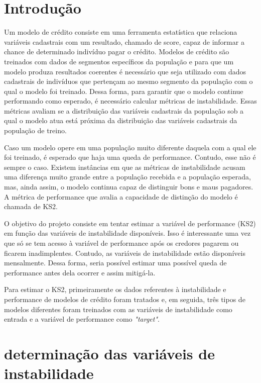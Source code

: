 \section{Introdução}
    Um modelo de crédito consiste em uma ferramenta estatística que relaciona variáveis cadastrais com um resultado, chamado de score, capaz de informar a chance de determinado indivíduo pagar o crédito.
    Modelos de crédito são treinados com dados de segmentos específicos da população e para que um modelo produza resultados coerentes é necessário que seja utilizado com dados cadastrais de indivíduos que pertençam ao mesmo segmento da população com o qual o modelo foi treinado. Dessa forma, para garantir que o modelo continue performando como esperado, é necessário calcular métricas de instabilidade. Essas métricas avaliam se a distribuição das variáveis cadastrais da população sob a qual o modelo atua está próxima da distribuição das variáveis cadastrais da população de treino.

    Caso um modelo opere em uma população muito diferente daquela com a qual ele foi treinado, é esperado que haja uma queda de performance. Contudo, esse não é sempre o caso. Existem instâncias em que as métricas de instabilidade acusam uma diferença muito grande entre a população recebida e a população esperada, mas, ainda assim, o modelo continua capaz de distinguir bons e maus pagadores. A métrica de performance que avalia a capacidade de distinção do modelo é chamada de KS2.
    
    O objetivo do projeto consiste em tentar estimar a variável de performance (KS2) em função das variáveis de instabilidade disponíveis. Isso é interessante uma vez que só se tem acesso à variável de performance após os credores pagarem ou ficarem inadimplentes. Contudo, as variáveis de instabilidade estão disponíveis mensalmente. Dessa forma, seria possível estimar uma possível queda de performance antes dela ocorrer e assim mitigá-la.

    Para estimar o KS2, primeiramente os dados referentes à instabilidade e performance de modelos de crédito foram tratados e, em seguida, três tipos de modelos diferentes foram treinados com as variáveis de instabilidade como entrada e a variável de performance como \emph{"target"}.
    
\section{determinação das variáveis de instabilidade}

